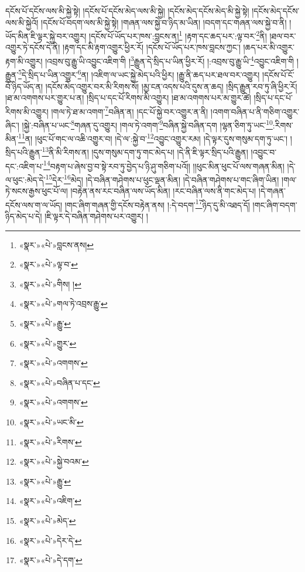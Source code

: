 དངོས་པོ་དངོས་ལས་མི་སྐྱེ་སྟེ། །དངོས་པོ་དངོས་མེད་ལས་མི་སྐྱེ། །དངོས་མེད་དངོས་མེད་མི་སྐྱེ་སྟེ། །དངོས་མེད་དངོས་ལས་མི་སྐྱེའོ། །དངོས་པོ་བདག་ལས་མི་སྐྱེ་སྟེ། །གཞན་ལས་སྐྱེ་བ་ཉིད་མ་ཡིན། །བདག་དང་གཞན་ལས་སྐྱེ་བ་ནི། །ཡོད་མིན་ཇི་ལྟར་སྐྱེ་བར་འགྱུར། །དངོས་པོ་ཡོད་པར་ཁས་:བླངས་ན།\footnote{«སྣར་»«པེ་»བླངས་ནས།} །རྟག་དང་ཆད་པར་:ལྟ་བར་\footnote{«སྣར་»«པེ་»ལྟ་བ་}ནི། །ཐལ་བར་འགྱུར་ཏེ་དངོས་དེ་ནི། །རྟག་དང་མི་རྟག་འགྱུར་ཕྱིར་རོ། །དངོས་པོ་ཡོད་པར་ཁས་བླངས་ཀྱང་། །ཆད་པར་མི་འགྱུར་རྟག་མི་འགྱུར། །འབྲས་བུ་རྒྱུ་ཡི་འབྱུང་འཇིག་གི །\footnote{«སྣར་»«པེ་»གིས། །}རྒྱུན་དེ་སྲིད་པ་ཡིན་ཕྱིར་རོ། །:འབྲས་བུ་རྒྱུ་ཡི་\footnote{«སྣར་»«པེ་»གལ་ཏེ་འབྲས་རྒྱུ་}འབྱུང་འཇིག་གི །རྒྱུན་\footnote{«སྣར་»«པེ་»རྒྱུ་}དེ་སྲིད་པ་ཡིན་འགྱུར་\footnote{«སྣར་»«པེ་»གྱུར་}ན། །འཇིག་ལ་ཡང་སྐྱེ་མེད་པའི་ཕྱིར། །རྒྱུ་ནི་ཆད་པར་ཐལ་བར་འགྱུར། །དངོས་པོ་ངོ་བོ་ཉིད་ཡོད་ན། །དངོས་མེད་འགྱུར་བར་མི་རིགས་སོ། །མྱ་ངན་འདས་པའི་དུས་ན་ཆད། །སྲིད་རྒྱུན་རབ་ཏུ་ཞི་ཕྱིར་རོ། །ཐ་མ་འགགས་པར་གྱུར་པ་ན། །སྲིད་པ་དང་པོ་རིགས་མི་འགྱུར། །ཐ་མ་འགགས་པར་མ་གྱུར་ཚེ། །སྲིད་པ་དང་པོ་རིགས་མི་འགྱུར། །གལ་ཏེ་ཐ་མ་འགག་\footnote{«སྣར་»«པེ་»འགགས་}བཞིན་ན། །དང་པོ་སྐྱེ་བར་འགྱུར་ན་ནི། །འགག་བཞིན་པ་ནི་གཅིག་འགྱུར་ཞིང་། །སྐྱེ་:བཞིན་པ་ཡང་\footnote{«སྣར་»«པེ་»བཞིན་པ་དང་}གཞན་དུ་འགྱུར། །གལ་ཏེ་འགག་\footnote{«སྣར་»«པེ་»འགགས་}བཞིན་སྐྱེ་བཞིན་དག །ལྷན་ཅིག་ཏུ་ཡང་\footnote{«སྣར་»«པེ་»ཡང་མི་}:རིགས་མིན་\footnote{«སྣར་»«པེ་»རིགས་}ན། །ཕུང་པོ་གང་ལ་འཆི་འགྱུར་བ། །དེ་ལ་:སྐྱེ་བ་\footnote{«སྣར་»«པེ་»སྐྱེ་བའམ་}འབྱུང་འགྱུར་རམ། །དེ་ལྟར་དུས་གསུམ་དག་ཏུ་ཡང་། །སྲིད་པའི་རྒྱུན་\footnote{«སྣར་»«པེ་»རྒྱུ་}ནི་མི་རིགས་ན། །དུས་གསུམ་དག་ཏུ་གང་མེད་པ། །དེ་ནི་ཇི་ལྟར་སྲིད་པའི་རྒྱུན། །འབྱུང་བ་དང་:འཇིག་པ་\footnote{«སྣར་»«པེ་»འཇིག་}བརྟག་པ་ཞེས་བྱ་བ་སྟེ་རབ་ཏུ་བྱེད་པ་ཉི་ཤུ་གཅིག་པའོ།། །།ཕུང་མིན་ཕུང་པོ་ལས་གཞན་མིན། །དེ་ལ་ཕུང་:མེད་དེ་\footnote{«སྣར་»«པེ་»མེད་}དེར་\footnote{«སྣར་»«པེ་»དེར་དེ་}མེད། །དེ་བཞིན་གཤེགས་པ་ཕུང་ལྡན་མིན། །དེ་བཞིན་གཤེགས་པ་གང་ཞིག་ཡིན། །གལ་ཏེ་སངས་རྒྱས་ཕུང་པོ་ལ། །བརྟེན་ནས་རང་བཞིན་ལས་ཡོད་མིན། །རང་བཞིན་ལས་ནི་གང་མེད་པ། །དེ་གཞན་དངོས་ལས་ག་ལ་ཡོད། །གང་ཞིག་གཞན་གྱི་དངོས་བརྟེན་ནས། །:དེ་བདག་\footnote{«སྣར་»«པེ་»དེ་དག་}ཉིད་དུ་མི་འཐད་དོ། །གང་ཞིག་བདག་ཉིད་མེད་པ་དེ། །ཇི་ལྟར་དེ་བཞིན་གཤེགས་པར་འགྱུར། །
